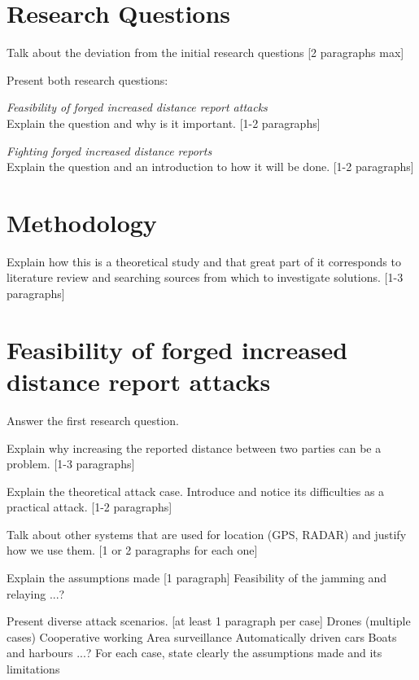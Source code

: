 \documentclass{article}
\begin{document}
\section{Research Questions}

Talk about the deviation from the initial research questions [2 paragraphs max]

Present both research questions:

\emph{Feasibility of forged increased distance report attacks}\\

Explain the question and why is it important. [1-2 paragraphs]

\emph{Fighting forged increased distance reports}\\

Explain the question and an introduction to how it will be done. [1-2 paragraphs]

\section{Methodology}

Explain how this is a theoretical study and that great part of it corresponds to literature review and searching sources from which to investigate solutions. [1-3 paragraphs]

\section{Feasibility of forged increased distance report attacks}

Answer the first research question.

Explain why increasing the reported distance between two parties can be a problem. [1-3 paragraphs]

Explain the theoretical attack case. Introduce and notice its difficulties as a practical attack. [1-2 paragraphs]

Talk about other systems that are used for location (GPS, RADAR) and justify how we use them. [1 or 2 paragraphs for each one]

Explain the assumptions made [1 paragraph]
   Feasibility of the jamming and relaying
   ...?
   
Present diverse attack scenarios. [at least 1 paragraph per case]
   Drones (multiple cases)
     Cooperative working
     Area surveillance
   Automatically driven cars
   Boats and harbours
  ...?
For each case, state clearly the assumptions made and its limitations
\end{document}
